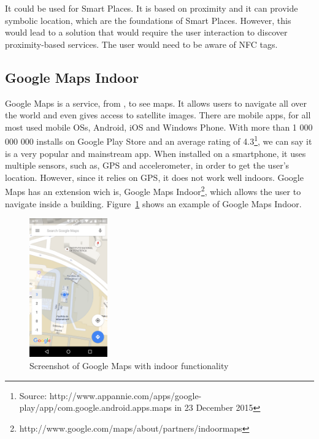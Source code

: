 It could be used for Smart Places.
It is based on proximity and it can provide symbolic location, which are the foundations of Smart Places.
However, this would lead to a solution that would require the user interaction to discover proximity-based services.
The user would need to be aware of \gls{NFC} tags.

\subsection{Google Maps Indoor}
\label{sub:background_google_maps_indoor}
Google Maps is a service, from , to see maps.
It allows users to navigate all over the world and even gives access to satellite images.
There are mobile apps, for all most used mobile \glspl{OS}, Android, iOS and Windows Phone.
With more than 1 000 000 000 installs on Google Play Store and an average rating of 4.3\footnote{Source: http://www.appannie.com/apps/google-play/app/com.google.android.apps.maps in 23 December 2015}, we can say it is a very popular and mainstream app.
When installed on a smartphone, it uses multiple sensors, such as, \gls{GPS} and accelerometer, in order to get the user's location.
However, since it relies on \gls{GPS}, it does not work well indoors.
Google Maps has an extension wich is, Google Maps Indoor\footnote{http://www.google.com/maps/about/partners/indoormaps}, which allows the user to navigate inside a building.
Figure~\ref{fig:google_maps_indoor} shows an example of Google Maps Indoor.

\begin{figure}[!ht]
  \centering
    \includegraphics[width=0.3\textwidth, keepaspectratio]{images/screenshots/google_maps_indoor}
    \caption[Google Maps Indoor]{Screenshot of Google Maps with indoor functionality}
    \label{fig:google_maps_indoor}
\end{figure}

